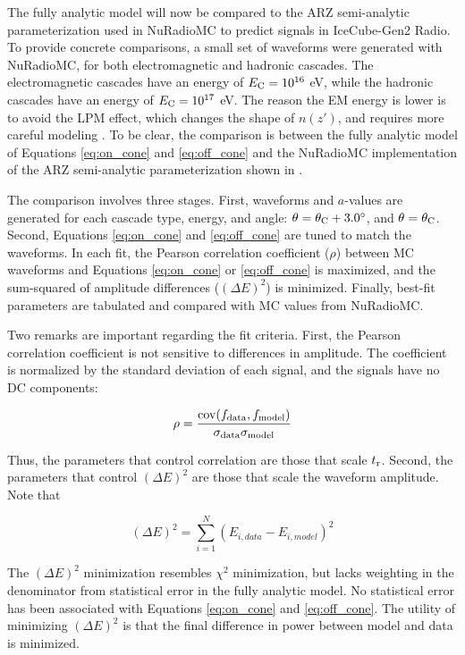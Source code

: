 \documentclass[amsmath,amssymb,aps,prd,10pt,twocolumn]{revtex4}
\DeclareMathOperator\cov{cov}
\begin{document}
The fully analytic model will now be compared to the ARZ semi-analytic parameterization \cite{PhysRevD.101.083005} used in NuRadioMC \cite{10.1140/epjc/s10052-020-7612-8} to predict signals in IceCube-Gen2 Radio.  To provide concrete comparisons, a small set of waveforms were generated with NuRadioMC, for both electromagnetic and hadronic cascades.  The electromagnetic cascades have an energy of $E_{\rm C} = 10^{16}$ eV, while the hadronic cascades have an energy of $E_{\rm C} = 10^{17}$ eV.  The reason the EM energy is lower is to avoid the LPM effect, which changes the shape of $n(z')$, and requires more careful modeling \cite{10.1016/j.astropartphys.2017.03.008}.  To be clear, the comparison is between the fully analytic model of Equations \ref{eq:on_cone} and \ref{eq:off_cone} and the NuRadioMC implementation of the ARZ semi-analytic parameterization shown in \cite{PhysRevD.101.083005}.

The comparison involves three stages.  First, waveforms and $a$-values are generated for each cascade type, energy, and angle: $\theta = \theta_{\rm C} + 3.0^{\circ}$, and $\theta = \theta_{\rm C}$.  Second, Equations \ref{eq:on_cone} and \ref{eq:off_cone} are tuned to match the waveforms.  In each fit, the Pearson correlation coefficient ($\rho$) between MC waveforms and Equations \ref{eq:on_cone} or \ref{eq:off_cone} is maximized, and the sum-squared of amplitude differences ($(\Delta E)^2$) is minimized.  Finally, best-fit parameters are tabulated and compared with MC values from NuRadioMC. 

Two remarks are important regarding the fit criteria.  First, the Pearson correlation coefficient is not sensitive to differences in amplitude.  The coefficient is normalized by the standard deviation of each signal, and the signals have no DC components:

\begin{equation}
\rho = \frac{\cov(f_{\rm data},f_{\rm model})}{\sigma_{\rm data} \sigma_{\rm model}}
\end{equation}

Thus, the parameters that control correlation are those that scale $t_{\rm r}$.  Second, the parameters that control $(\Delta E)^2$ are those that scale the waveform amplitude.  Note that

\begin{equation}
(\Delta E)^2 = \sum_{i = 1}^{N} (E_{i,data} - E_{i,model})^2
\end{equation}

The $(\Delta E)^2$ minimization resembles $\chi^2$ minimization, but lacks weighting in the denominator from statistical error in the fully analytic model.  No statistical error has been associated with Equations \ref{eq:on_cone} and \ref{eq:off_cone}.  The utility of minimizing $(\Delta E)^2$ is that the final difference in power between model and data is minimized.
\end{document}
